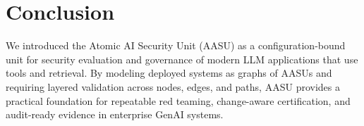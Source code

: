 \documentclass[11pt]{article}
\newcommand{\AASU}{\textsc{AASU}}
\newcommand{\AASUs}{\AASU{}s}
\begin{document}
\section{Conclusion}
We introduced the Atomic AI Security Unit (\AASU{}) as a configuration-bound unit for security evaluation and governance of modern LLM applications that use tools and retrieval.
By modeling deployed systems as graphs of \AASUs{} and requiring layered validation across nodes, edges, and paths, \AASU{} provides a practical foundation for repeatable red teaming,
change-aware certification, and audit-ready evidence in enterprise GenAI systems.



\end{document}
